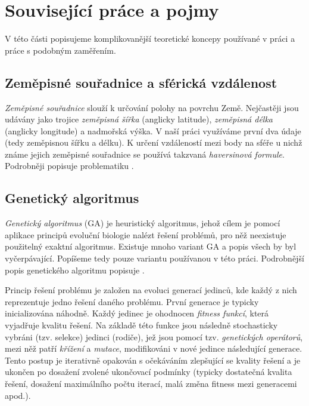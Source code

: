 \chapter{Související práce a pojmy}
\label{chap:teoreticka_cast}

V této části popisujeme komplikovanější teoretické koncepy používané v práci a
práce s podobným zaměřením.


\section{Zeměpisné souřadnice a sférická vzdálenost}
\label{sect:zem_souradnice}

\emph{Zeměpisné souřadnice}  slouží k určování polohy na povrchu Země. Nejčastěji 
jsou udávány jako trojice \emph{zeměpisná šířka} (anglicky latitude), 
\emph{zeměpisná délka} (anglicky longitude) a nadmořská výška. V naší práci
využíváme první dva údaje (tedy zeměpisnou šířku a délku).
K určení vzdáleností mezi body na sféře u nichž známe jejich zeměpisné 
souřadnice se používá takzvaná \emph{haversinová formule}. 
Podrobněji popisuje problematiku \citet{chang2008introduction}.


\section{Genetický algoritmus}
\label{section:genetic_alg}
\emph{Genetický algoritmus} (GA) je heuristický algoritmus, jehož cílem je pomocí
aplikace principů evoluční biologie nalézt řešení problémů, pro něž neexistuje
použitelný exaktní algoritmus. Existuje mnoho variant GA a popis všech by byl
vyčerpávající. Popíšeme tedy pouze variantu používanou v této práci. Podrobnější
popis genetického algoritmu popisuje \citet{mitchell1998introduction}.

Princip řešení problému je založen na evoluci generací jedinců, kde každý z nich
reprezentuje jedno řešení daného problému. První generace je typicky 
inicializována náhodně. Každý jedinec je ohodnocen \emph{fitness funkcí}, která 
vyjadřuje kvalitu řešení. Na základě této funkce jsou následně stochasticky vybráni (tzv. selekce) 
jedinci (rodiče), jež jsou pomocí tzv. \emph{genetických operátorů}, mezi něž 
patří \emph{křížení} a  \emph{mutace},
modifikováni v nové jedince následující generace. Tento postup je iterativně opakován s 
očekáváním zlepšující se kvality řešení a je ukončen po dosažení zvolené 
ukončovací podmínky (typicky dostatečná kvalita řešení, dosažení maximálního
počtu iterací, malá změna fitness mezi generacemi apod.).

